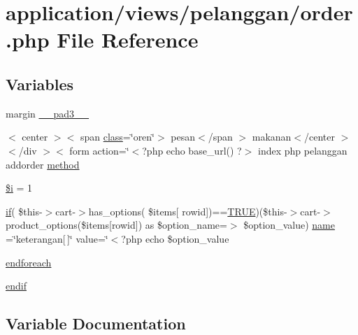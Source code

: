 \hypertarget{pelanggan_2order_8php}{}\section{application/views/pelanggan/order.php File Reference}
\label{pelanggan_2order_8php}
\subsection*{Variables}
\begin{DoxyCompactItemize}
\item 
margin \mbox{\hyperlink{pelanggan_2order_8php_a27c62c29edcb85a6b0661a6e3f8516c1}{\+\_\+\+\_\+pad3\+\_\+\+\_\+}}
\item 
$<$ center $>$$<$ span \mbox{\hyperlink{waiter_2olaporan_8php_a185c73c6507391d1eb38c776b68ce96d}{class}}=\char`\"{}oren\char`\"{}$>$ pesan$<$/span $>$ makanan$<$/center $>$$<$/div $>$$<$ form action=\char`\"{}$<$?php echo base\+\_\+url() ?$>$ index php pelanggan addorder \mbox{\hyperlink{pelanggan_2order_8php_a53298a7ba40baa1ff3bee5cc58d7536f}{method}}
\item 
\mbox{\hyperlink{pelanggan_2order_8php_a83018d9153d17d91fbcf3bc10158d34f}{\$i}} = 1
\item 
\mbox{\hyperlink{_code_igniter_8php_a68ca62d45495d195f67d234bdafb1d1f}{if}}( \$this-\/$>$cart-\/$>$has\+\_\+options( \$items\mbox{[} \textquotesingle{}rowid\textquotesingle{}\mbox{]})==\mbox{\hyperlink{constants_8php_ae04a3efe6aa42044f803ee90c2277846}{T\+R\+UE}})(\$this-\/$>$cart-\/$>$product\+\_\+options(\$items\mbox{[}\textquotesingle{}rowid\textquotesingle{}\mbox{]}) as \$option\+\_\+name=$>$ \$option\+\_\+value) \mbox{\hyperlink{pelanggan_2order_8php_afb270cde4944e425a37cf277116a7f43}{name}} =\char`\"{}keterangan\mbox{[}$\,$\mbox{]}\char`\"{} value=\char`\"{}$<$?php echo \$option\+\_\+value
\item 
\mbox{\hyperlink{pelanggan_2order_8php_a672d9707ef91db026c210f98cc601123}{endforeach}}
\item 
\mbox{\hyperlink{pelanggan_2order_8php_a82cd33ca97ff99f2fcc5e9c81d65251b}{endif}}
\end{DoxyCompactItemize}


\subsection{Variable Documentation}
\mbox{\label{pelanggan_2order_8php_a83018d9153d17d91fbcf3bc10158d34f}} 
